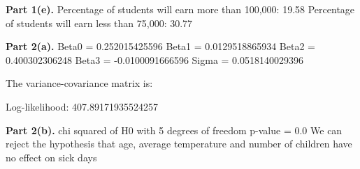 \documentclass[letterpaper,12pt]{article}
\theoremstyle{definition}
\begin{document}
\vspace{5mm} %

\noindent\textbf{Part 1(e).}
\newline Percentage of students will earn more than 100,000:  19.58%
\newline Percentage of students will earn less than 75,000:  30.77%

\vspace{5mm} %

\noindent\textbf{Part 2(a).} 
\newline Beta0 = 0.252015425596  
\newline Beta1 = 0.0129518865934 
\newline Beta2 = 0.400302306248 
\newline Beta3 = -0.0100091666596 
\newline Sigma = 0.0518140029396
\vspace{20mm} %

The variance-covariance matrix is: 
 \newline [ 1.  0.  0.  0.  0.]
 \newline [ 0.  1.  0.  0.  0.]
 \newline [ 0.  0.  1.  0.  0.]
 \newline [ 0.  0.  0.  1.  0.]
 \newline [ 0.  0.  0.  0.  1.]

Log-likelihood:  407.89171935524257

\noindent\textbf{Part 2(b).} 
\newline chi squared of H0 with 5 degrees of freedom p-value = 0.0
\newline We can reject the hypothesis that age, average temperature and number of children have no effect on sick days
\end{document}
